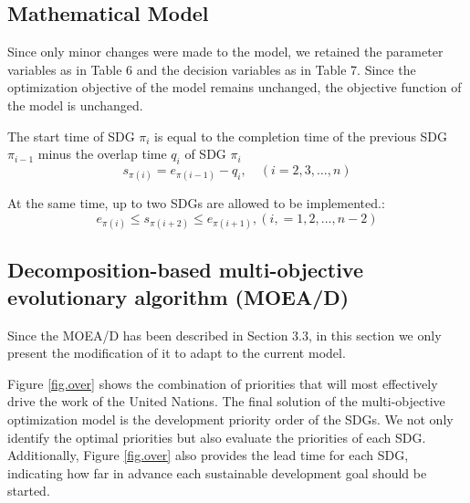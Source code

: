 \documentclass[10pt]{mcmthesis}
\begin{document}
\subsection{Mathematical Model}
Since only minor changes were made to the model, we retained the parameter variables as in Table 6 and the decision variables as in Table 7. Since the optimization objective of the model remains unchanged, the objective function of the model is unchanged.


The start time of SDG $\pi_{i}$ is equal to the completion time of the previous SDG $\pi_{i-1}$ minus the overlap time $q_i$ of SDG $\pi_{i}$
\begin{equation}
s_{\pi(i)}=e_{\pi(i-1)}-q_i, \quad(i=2,3, \ldots, n)
\end{equation}

At the same time, up to two SDGs are allowed to be implemented.:
\begin{equation}
    e_{\pi(i)}  \leq  s_{\pi(i+2)}  \leq e_{\pi(i+1)},          (i,=1,2,...,n-2)
\end{equation}

\subsection{Decomposition-based multi-objective evolutionary algorithm (MOEA/D)}%
Since the MOEA/D has been described in Section 3.3, in this section we only present the modification of it to adapt to the current model.

Figure \ref{fig.over} shows the combination of priorities that will most effectively drive the work of the United Nations. The final solution of the multi-objective optimization model is the development priority order of the SDGs. We not only identify the optimal priorities but also evaluate the priorities of each SDG. Additionally, Figure \ref{fig.over} also provides the lead time for each SDG, indicating how far in advance each sustainable development goal should be started.
\end{document}
